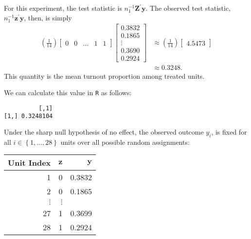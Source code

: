 \documentclass[
  12pt,
  leqno]{article}
\newenvironment{Shaded}{\begin{snugshade}}{\end{snugshade}}
\newcommand{\CommentTok}[1]{\textcolor[rgb]{0.56,0.35,0.01}{\textit{#1}}}
\newcommand{\DecValTok}[1]{\textcolor[rgb]{0.00,0.00,0.81}{#1}}
\newcommand{\KeywordTok}[1]{\textcolor[rgb]{0.13,0.29,0.53}{\textbf{#1}}}
\newcommand{\NormalTok}[1]{#1}
\newcommand{\OperatorTok}[1]{\textcolor[rgb]{0.81,0.36,0.00}{\textbf{#1}}}
\newcommand{\StringTok}[1]{\textcolor[rgb]{0.31,0.60,0.02}{#1}}
\DeclareMathOperator{\1}{\mathbbm{1}}
\begin{document}
For this experiment, the test statistic is
\(n_1^{-1}\mathbf{Z}^{\prime}\mathbf{y}\). The observed test statistic,
\(n_1^{-1}\mathbf{z}^{\prime}\mathbf{y}\), then, is simply
\begin{align*}
\left(\frac{1}{14}\right) \begin{bmatrix} 0 & 0 & \dots & 1 & 1 \end{bmatrix} \begin{bmatrix}  0.3832 \\ 0.1865 \\ \vdots \\ 0.3690 \\ 0.2924 \end{bmatrix} & \approx \left(\frac{1}{14}\right)\begin{bmatrix} 4.5473 \end{bmatrix} \\
& \approx 0.3248.
\end{align*} This quantity is the mean turnout proportion among treated
units.

We can calculate this value in \texttt{R} as follows: \scriptsize

\begin{Shaded}
\end{Shaded}

\begin{verbatim}
          [,1]
[1,] 0.3248104
\end{verbatim}

\normalsize

Under the sharp null hypothesis of no effect, the observed outcome
\(y_i\), is fixed for all \(i \in \left\{1 , \dots , 28\right\}\) units
over all possible random assignments:

\begin{table}[ht]
\centering
\begin{tabular}{rrr}
\hline
Unit Index & $\mathbf{z}$ & $\mathbf{y}$ \\ 
\hline
1  & 0  & 0.3832  \\ 
2  & 0  & 0.1865  \\ 
$\vdots$ & $\vdots$ \\ 
27 & 1  & 0.3699 \\ 
28 & 1  & 0.2924 \\ 
\hline
\end{tabular}
\end{table}
\end{document}
